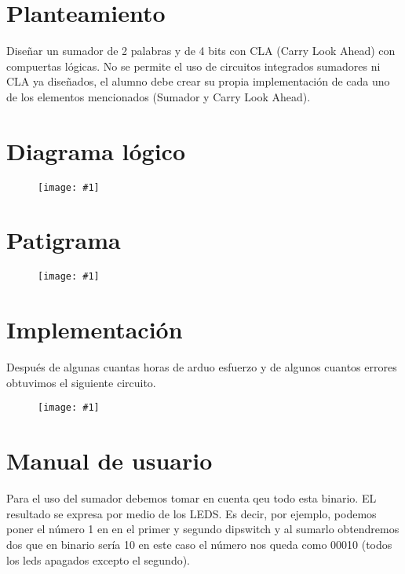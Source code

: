\documentclass{mylib/reporte}
\newcommand{\insertImage}[2]{
	\begin{figure}[H]
		\centering
		\texttt{[image: \#1]}
	\end{figure}
}
\begin{document}
\section{Planteamiento}

Diseñar un sumador de 2 palabras y de 4 bits con CLA (Carry Look Ahead) con compuertas lógicas. No se permite el
uso de circuitos integrados sumadores ni CLA ya diseñados, el alumno debe crear su propia implementación de cada
uno de los elementos mencionados (Sumador y Carry Look Ahead).

\section{Diagrama lógico}

\insertImage{img/dise_proy2/compLog}{10}

\section{Patigrama}

\insertImage{img/dise_proy2/patigrama}{11}

\section{Implementación}

Después de algunas cuantas horas de arduo esfuerzo y de algunos cuantos errores obtuvimos el siguiente circuito.

\insertImage{img/dise_proy2/implementacion}{15}

\section{Manual de usuario}

Para el uso del sumador debemos tomar en cuenta qeu todo esta binario. EL resultado se expresa por medio de los LEDS.
Es decir, por ejemplo, podemos poner el número 1 en en el primer y segundo dipswitch y al sumarlo obtendremos dos que en binario sería 10 en este caso el número nos queda como 00010 (todos los leds apagados excepto el segundo).
\end{document}
